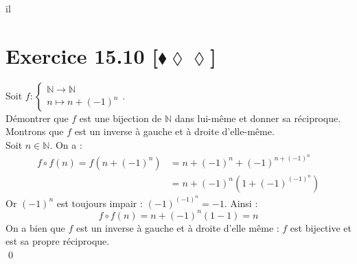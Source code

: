 il\documentclass[10pt]{article}
\begin{document}
\section*{Exercice 15.10 [$\blacklozenge\lozenge\lozenge$]}
\begin{tcolorbox}[enhanced, width=7.6in, center, size=fbox, fontupper=\large, drop shadow southwest]
    Soit $f:\begin{cases}\mathbb{N} \to \mathbb{N} \\ n \mapsto n + (-1)^n\end{cases}$.\\
    Démontrer que $f$ est une bijection de $\mathbb{N}$ dans lui-même et donner sa réciproque.\\[0.2cm]
    Montrons que $f$ est un inverse à gauche et à droite d'elle-même.\\
    Soit $n\in\mathbb{N}$. On a :
    \begin{align*}
        f \circ f (n) = f(n + (-1)^n) &= n + (-1)^n + (-1)^{n + (-1)^n} \\
        &= n + (-1)^n(1+(-1)^{(-1)^n})
    \end{align*}
    Or $(-1)^n$ est toujours impair : $(-1)^{(-1)^n} = -1$. Ainsi :
    \begin{equation*}
        f\circ f(n) = n + (-1)^n(1-1) = n
    \end{equation*}
    On a bien que $f$ est un inverse à gauche et à droite d'elle même : $f$ est bijective et est sa propre réciproque.\\
    \qed
\end{tcolorbox}
\end{document}

